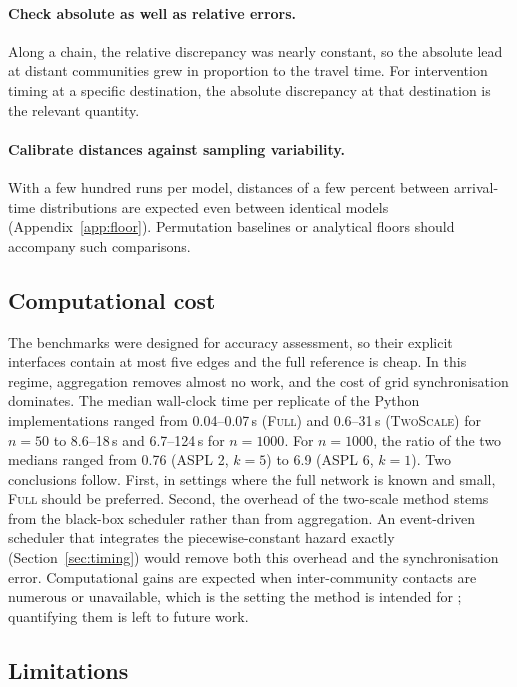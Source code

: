 \documentclass[a4paper,fleqn]{cas-sc}
\newcommand{\Full}{\textup{\textsc{Full}}}
\newcommand{\TS}{\textup{\textsc{TwoScale}}}
\begin{document}
\paragraph{Check absolute as well as relative errors.}
Along a chain, the relative discrepancy was nearly constant, so the absolute lead at distant communities grew in proportion to the travel time. For intervention timing at a specific destination, the absolute discrepancy at that destination is the relevant quantity.

\paragraph{Calibrate distances against sampling variability.}
With a few hundred runs per model, distances of a few percent between arrival-time distributions are expected even between identical models (Appendix~\ref{app:floor}). Permutation baselines or analytical floors should accompany such comparisons.

\subsection{Computational cost}
\label{sec:disc_cost}

The benchmarks were designed for accuracy assessment, so their explicit interfaces contain at most five edges and the full reference is cheap. In this regime, aggregation removes almost no work, and the cost of grid synchronisation dominates. The median wall-clock time per replicate of the Python implementations ranged from 0.04--0.07\,s (\Full{}) and 0.6--31\,s (\TS{}) for $n=50$ to 8.6--18\,s and 6.7--124\,s for $n=1000$. For $n=1000$, the ratio of the two medians ranged from 0.76 (ASPL 2, $k=5$) to 6.9 (ASPL 6, $k=1$). Two conclusions follow. First, in settings where the full network is known and small, \Full{} should be preferred. Second, the overhead of the two-scale method stems from the black-box scheduler rather than from aggregation. An event-driven scheduler that integrates the piecewise-constant hazard exactly (Section~\ref{sec:timing}) would remove both this overhead and the synchronisation error. Computational gains are expected when inter-community contacts are numerous or unavailable, which is the setting the method is intended for \citep{kuryliak2025towards}; quantifying them is left to future work.

\subsection{Limitations}
\end{document}
